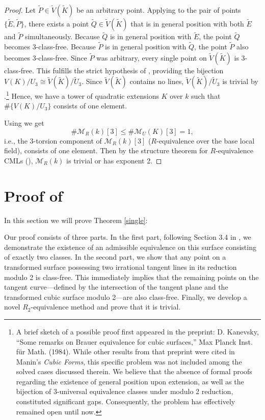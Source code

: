 \documentclass[11pt]{article}
\theoremstyle{definition}
\begin{document}
\begin{proof}
Let $\tilde{P} \in \tilde{V}(\tilde{K})$ be an arbitrary point. Applying  to the pair of points $\{\tilde{E}, \tilde{P}\}$, there exists a point $\tilde{Q} \in \tilde{V}(\tilde{K})$ that is in general position with both $\tilde{E}$ and $\tilde{P}$ simultaneously. Because $\tilde{Q}$ is in general position with $\tilde{E}$, the point $\tilde{Q}$ becomes 3-class-free. Because $\tilde{P}$ is in general position with $\tilde{Q}$, the point $\tilde{P}$ also becomes 3-class-free. Since $\tilde{P}$ was arbitrary, every single point on $\tilde{V}(\tilde{K})$ is 3-class-free. This fulfills the strict hypothesis of , providing the bijection $V(K)/U_3 \cong \tilde{V}(\tilde{K})/\tilde{U}_3$. Since $\tilde{V}(\tilde{K})$ contains no lines, $\tilde{V}(\tilde{K})/\tilde{U}_3$ is trivial by .\footnote{A brief sketch of a possible proof first appeared in the preprint: D. Kanevsky, ``Some remarks on Brauer equivalence for cubic surfaces,'' Max Planck Inst. für Math. (1984). While other results from that preprint were cited in Manin’s \textit{Cubic Forms}, this specific problem was not included among the solved cases discussed therein. We believe that the absence of formal proofs regarding the existence of general position upon extension, as well as the bijection of 3-universal equivalence classes under modulo 2 reduction, constituted significant gaps. Consequently, the problem has effectively remained open until now.} Hence, we have a tower of quadratic extensions $K$ over $k$ such that $\#\{V(K)/U_3\}$ consists of one element.

Using  we get
\begin{equation}
    \#\mathcal{M}_{R}(k)[3] \leq \#\mathcal{M}_{U}(K)[3]=1,
\end{equation}
i.e., the 3-torsion component of $\mathcal{M}_{R}(k)[3]$ ($R$-equivalence over the base local field), consists of one element. Then by the structure theorem for $R$-equivalence CMLs (), $\mathcal{M}_{R}(k)$ is trivial or has exponent 2.
\end{proof}

\section{Proof of }
\label{sec:1pt-r-equiv}

In this section we will prove Theorem \ref{single}:

\MainResultTwo*

Our proof consists of three parts. In the first part, following Section 3.4 in \cite{dimitrikanevsky},  we demonstrate the existence of an admissible equivalence on this surface consisting of exactly two classes. In the second part, we show that any point on a transformed surface possessing two irrational tangent lines in its reduction modulo 2 is class-free. This immediately implies that the remaining points on the tangent curve—defined by the intersection of the tangent plane and the transformed cubic surface modulo 2—are also class-free. Finally, we develop a novel $R_2$-equivalence method and prove that it is trivial.
\end{document}
